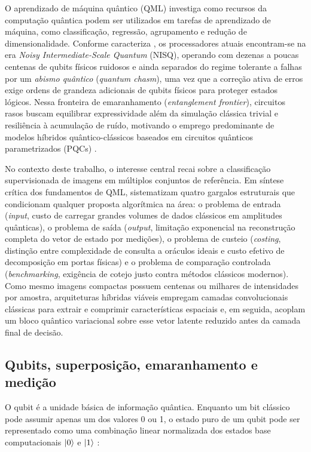 \documentclass[
    12pt,
    openright,
    oneside,
    a4paper,
    english,
    brazil
]{abntex2}
\begin{document}
O aprendizado de máquina quântico (QML) investiga como recursos da computação quântica podem ser utilizados em tarefas de aprendizado de máquina, como classificação, regressão, agrupamento e redução de dimensionalidade. Conforme caracteriza , os processadores atuais encontram-se na era \textit{Noisy Intermediate-Scale Quantum} (NISQ), operando com dezenas a poucas centenas de qubits físicos ruidosos e ainda separados do regime tolerante a falhas por um \textit{abismo quântico} (\textit{quantum chasm}), uma vez que a correção ativa de erros exige ordens de grandeza adicionais de qubits físicos para proteger estados lógicos. Nessa fronteira de emaranhamento (\textit{entanglement frontier}), circuitos rasos buscam equilibrar expressividade além da simulação clássica trivial e resiliência à acumulação de ruído, motivando o emprego predominante de modelos híbridos quântico-clássicos baseados em circuitos quânticos parametrizados (PQCs) \cite{biamonte2017qml,preskill2018nisq,cerezo2021variational}.

No contexto deste trabalho, o interesse central recai sobre a classificação supervisionada de imagens em múltiplos conjuntos de referência. Em síntese crítica dos fundamentos de QML,  sistematizam quatro gargalos estruturais que condicionam qualquer proposta algorítmica na área: o problema de entrada (\textit{input}, custo de carregar grandes volumes de dados clássicos em amplitudes quânticas), o problema de saída (\textit{output}, limitação exponencial na reconstrução completa do vetor de estado por medições), o problema de custeio (\textit{costing}, distinção entre complexidade de consulta a oráculos ideais e custo efetivo de decomposição em portas físicas) e o problema de comparação controlada (\textit{benchmarking}, exigência de cotejo justo contra métodos clássicos modernos). Como mesmo imagens compactas possuem centenas ou milhares de intensidades por amostra, arquiteturas híbridas viáveis empregam camadas convolucionais clássicas para extrair e comprimir características espaciais e, em seguida, acoplam um bloco quântico variacional sobre esse vetor latente reduzido antes da camada final de decisão.

\subsection{Qubits, superposição, emaranhamento e medição}

O qubit é a unidade básica de informação quântica. Enquanto um bit clássico pode assumir apenas um dos valores 0 ou 1, o estado puro de um qubit pode ser representado como uma combinação linear normalizada dos estados base computacionais \(\ket{0}\) e \(\ket{1}\) \cite{nielsen2010quantum}:
\end{document}

